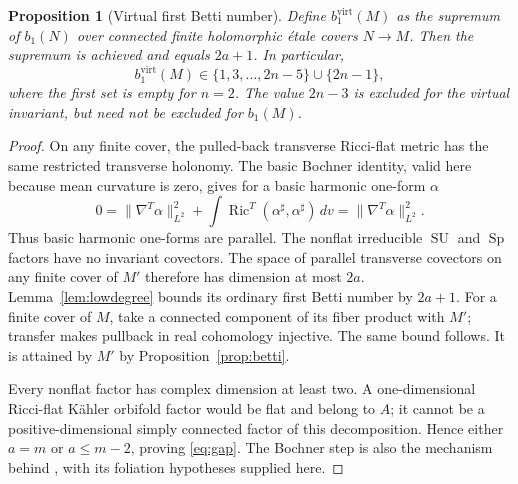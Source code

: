 \documentclass[12pt]{amsart}
\newtheorem{prop}[thm]{Proposition}
\theoremstyle{definition}
\theoremstyle{remark}
\numberwithin{equation}{section}
\DeclareMathOperator{\Ric}{Ric}
\newcommand{\virt}{\mathrm{virt}}
\newcommand{\SU}{\operatorname{SU}}
\newcommand{\Sp}{\operatorname{Sp}}
\begin{document}
\begin{prop}[Virtual first Betti number]\label{prop:virtual}
Define $b_1^{\virt}(M)$ as the supremum of $b_1(N)$ over connected finite
holomorphic \'etale covers $N\to M$. Then the supremum is achieved and
equals $2a+1$. In particular,
\begin{equation}\label{eq:gap}
b_1^{\virt}(M)\in\{1,3,\ldots,2n-5\}\cup\{2n-1\},
\end{equation}
where the first set is empty for $n=2$. The value $2n-3$ is excluded
for the virtual invariant, but need not be excluded for $b_1(M)$.
\end{prop}
\begin{proof}
On any finite cover, the pulled-back transverse Ricci-flat metric has
the same restricted transverse holonomy. The basic Bochner identity,
valid here because mean curvature is zero, gives for a basic harmonic
one-form $\alpha$
\[
0=\|\nabla^T\alpha\|_{L^2}^2+
\int\Ric^T(\alpha^\sharp,\alpha^\sharp)\,dv
=\|\nabla^T\alpha\|_{L^2}^2.
\]
Thus basic harmonic one-forms are parallel. The nonflat irreducible
$\SU$ and $\Sp$ factors have no invariant covectors. The space of
parallel transverse covectors on any finite cover of $M'$ therefore
has dimension at most $2a$. Lemma~\ref{lem:lowdegree} bounds its ordinary
first Betti number by $2a+1$. For a finite cover of $M$, take a connected
component of its fiber product with $M'$; transfer makes pullback in
real cohomology injective. The same bound follows. It is attained by
$M'$ by Proposition~\ref{prop:betti}.

Every nonflat factor has complex dimension at least two. A one-dimensional
Ricci-flat K\"ahler orbifold factor would be flat and belong to $A$;
it cannot be a positive-dimensional simply connected factor of this
decomposition. Hence either $a=m$ or $a\leq m-2$, proving
\eqref{eq:gap}. The Bochner step is also the mechanism behind
\cite[Proposition 6.4]{Gomes}, with its foliation hypotheses supplied here.
\end{proof}
\end{document}
